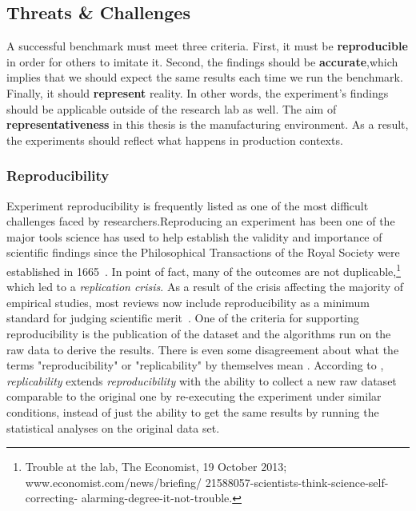 \subsection{Threats \& Challenges}
A successful benchmark must meet three criteria.
First, it must be \textbf{reproducible} in order for others to imitate it.
Second, the findings should be \textbf{accurate},which implies that we should expect the same results each time we run the benchmark.
Finally, it should \textbf{represent} reality.
In other words, the experiment's findings should be applicable outside of the research lab as well.
The aim of \textbf{representativeness} in this thesis is the manufacturing environment.
As a result, the experiments should reflect what happens in production contexts.

\subsubsection{Reproducibility}\label{subsec:soa_reproducibility}

Experiment reproducibility is frequently listed as one of the most difficult challenges faced by researchers.Reproducing an experiment has been one of the major tools science has used to help establish the validity and importance of scientific findings since the Philosophical Transactions of the Royal Society were established in 1665~\cite{hankins1986debate}. In point of fact, many of the outcomes are not duplicable,\footnote{Trouble at the lab, The Economist, 19 October 2013;  www.economist.com/news/briefing/ 21588057-scientists-think-science-self-correcting- alarming-degree-it-not-trouble.} which led to a \emph{replication crisis}.
As a result of the crisis affecting the majority of empirical studies, most reviews now include reproducibility as a minimum standard for judging scientific merit~\cite{peng2011reproducible}.
One of the criteria for  supporting reproducibility is the publication of the dataset and the algorithms run on the raw data to derive the results.
There is even some disagreement about what the terms "reproducibility" or "replicability" by themselves mean \cite{goodman2016does}.
According to \cite{echtler2018open}, \emph{replicability} extends \emph{reproducibility} with the ability to collect a new raw dataset comparable to the original one by re-executing the experiment under similar conditions, instead of just the ability to get the same results by running the statistical analyses on the original data set.



